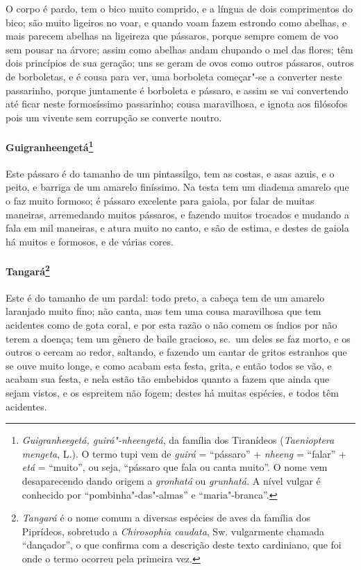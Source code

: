  O corpo é pardo, tem o bico muito comprido, e a língua de dois
comprimentos do bico; são muito ligeiros no voar, e quando voam fazem
estrondo como abelhas, e mais parecem abelhas na ligeireza que
pássaros, porque sempre comem de voo sem pousar na árvore; assim como
abelhas andam chupando o mel das flores; têm dois princípios de sua
geração; uns se geram de ovos como outros pássaros, outros de
borboletas, e é cousa para ver, uma borboleta começar"-se a converter
neste passarinho, porque juntamente é borboleta e pássaro, e assim se
vai convertendo até ficar neste formosíssimo passarinho; cousa
maravilhosa, e ignota aos filósofos pois um vivente sem corrupção se
converte noutro.

\paragraph{Guigranheengetá\footnote{ \textit{Guigranheegetá,
guirá"-nheengetá}, da família dos Tiranídeos (\textit{Taenioptera
mengeta}, L.). O termo tupi vem de \textit{guirá} = ``pássaro'' +
\textit{nheeng} = ``falar'' + \textit{etá} = ``muito'', ou seja, ``pássaro
que fala ou canta muito''. O nome vem desaparecendo dando origem a
\textit{gronhatá} ou \textit{grunhatá.} A nível vulgar é conhecido por
``pombinha"-das"-almas'' e ``maria"-branca''.}} Este pássaro é
do tamanho de um pintassilgo, tem as costas, e asas azuis, e o peito, e
barriga de um amarelo finíssimo. Na testa tem um diadema amarelo que o
faz muito formoso; é pássaro excelente para gaiola, por falar de muitas
maneiras, arremedando muitos pássaros, e fazendo muitos trocados e
mudando a fala em mil maneiras, e atura muito no canto, e são de
estima, e destes de gaiola há muitos e formosos, e de várias cores. 

\paragraph{Tangará\footnote{ \textit{Tangará} é o nome comum a
diversas espécies de aves da família dos Piprídeos, sobretudo a
\textit{Chirosophia caudata}, Sw. vulgarmente chamada ``dançador'', o
que confirma com a descrição deste texto cardiniano, que foi onde o
termo ocorreu pela primeira vez.}} Este é do tamanho de um
pardal: todo preto, a cabeça tem de um amarelo laranjado muito fino;
não canta, mas tem uma cousa maravilhosa que tem acidentes como de gota
coral, e por esta razão o não comem os índios por não terem a doença;
tem um gênero de baile gracioso, sc.~um deles se faz morto, e os
outros o cercam ao redor, saltando, e fazendo um cantar de gritos
estranhos que se ouve muito longe, e como acabam esta festa, grita, e
então todos se vão, e acabam sua festa, e nela estão tão embebidos
quanto a fazem que ainda que sejam vistos, e os espreitem não fogem;
destes há muitas espécies, e todos têm acidentes. 

